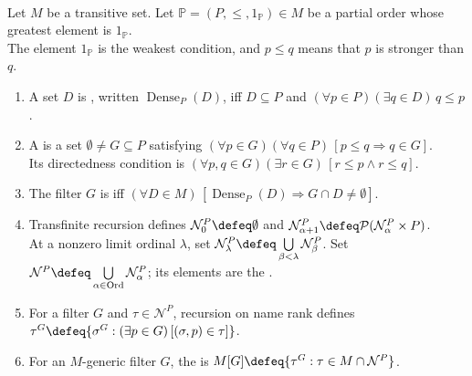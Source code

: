 \begin{definition} \label{def:forcing-generic-filter-and-extension} \\
Let $M$ be a transitive set. Let $\mathbb{P}=(P,\leq,1_{\mathbb{P}})\in M$ be a partial order whose greatest element is $1_{\mathbb{P}}$.\\
The element $1_{\mathbb{P}}$ is the weakest condition, and $p\leq q$ means that $p$ is stronger than $q$.
\begin{enumerate}[label=(\roman*)]
\setlength{\itemsep}{0pt}
\item A set $D$ is , written $\operatorname{Dense}_P(D)$, iff $D\subseteq P$ and $(\forall p\in P)(\exists q\in D)\,q\leq p$.
\item A  is a set $\emptyset\neq G\subseteq P$ satisfying $(\forall p\in G)(\forall q\in P)\,[p\leq q\Rightarrow q\in G]$.\\
Its directedness condition is $(\forall p,q\in G)(\exists r\in G)\,[r\leq p\land r\leq q]$.
\item The filter $G$ is  iff $(\forall D\in M)\,[\operatorname{Dense}_P(D)\Rightarrow G\cap D\neq\emptyset]$.
\item Transfinite recursion defines $\mathcal{N}_0^P\defeq\emptyset$ and $\mathcal{N}_{\alpha+1}^P\defeq\mathcal{P}(\mathcal{N}_\alpha^P\times P)$.\\
At a nonzero limit ordinal $\lambda$, set $\mathcal{N}_\lambda^P\defeq\bigcup\limits_{\beta<\lambda}\mathcal{N}_\beta^P$. Set $\mathcal{N}^P\defeq\bigcup\limits_{\alpha\in\mathrm{Ord}}\mathcal{N}_\alpha^P$; its elements are the .
\item For a filter $G$ and $\tau\in\mathcal{N}^P$, recursion on name rank defines $\tau^G\defeq\{\sigma^G:(\exists p\in G)\,[(\sigma,p)\in\tau]\}$.
\item For an $M$-generic filter $G$, the  is $M[G]\defeq\{\tau^G:\tau\in M\cap\mathcal{N}^P\}$.
\end{enumerate}
\end{definition}


